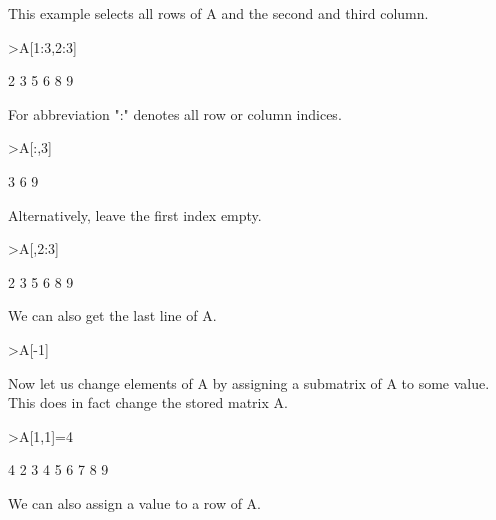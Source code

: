 \documentclass{article}
\begin{document}
\begin{eulernotebook}
\begin{eulercomment}
\begin{eulercomment}
\begin{eulercomment}
\begin{eulercomment}
\begin{eulercomment}
\begin{eulercomment}
\begin{eulercomment}
This example selects all rows of A and the second and third column.
\end{eulercomment}
\begin{eulerprompt}
>A[1:3,2:3]
\end{eulerprompt}
\begin{euleroutput}
              2             3 
              5             6 
              8             9 
\end{euleroutput}
\begin{eulercomment}
For abbreviation ":" denotes all row or column indices.
\end{eulercomment}
\begin{eulerprompt}
>A[:,3]
\end{eulerprompt}
\begin{euleroutput}
              3 
              6 
              9 
\end{euleroutput}
\begin{eulercomment}
Alternatively, leave the first index empty.
\end{eulercomment}
\begin{eulerprompt}
>A[,2:3]
\end{eulerprompt}
\begin{euleroutput}
              2             3 
              5             6 
              8             9 
\end{euleroutput}
\begin{eulercomment}
We can also get the last line of A.
\end{eulercomment}
\begin{eulerprompt}
>A[-1]
\end{eulerprompt}
\begin{euleroutput}
  [7,  8,  9]
\end{euleroutput}
\begin{eulercomment}
Now let us change elements of A by assigning a submatrix of A to some
value. This does in fact change the stored matrix A.
\end{eulercomment}
\begin{eulerprompt}
>A[1,1]=4
\end{eulerprompt}
\begin{euleroutput}
              4             2             3 
              4             5             6 
              7             8             9 
\end{euleroutput}
\begin{eulercomment}
We can also assign a value to a row of A.
\end{eulercomment}

\end{eulercomment}
\end{eulercomment}
\end{eulercomment}
\end{eulercomment}
\end{eulercomment}
\end{eulercomment}
\end{eulernotebook}
\end{document}
